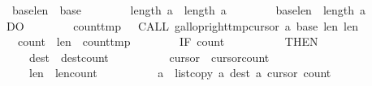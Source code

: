 \begin{isabellebody}
\ \ \ \ \ \ \ {\isacharparenleft}\isactrlbsup {\isasymsigma}\isactrlesup base{}{\isacharplus}\isactrlbsup {\isasymsigma}\isactrlesup len{}\ {\isacharequal}\ \isactrlbsup {\isasymsigma}\isactrlesup base{}{\isacharparenright}\ {\isasymand}\isanewline
\ \ \ \ \ \ \ length\ {\isasymacute}a\ {\isacharequal}\ length\ \isactrlbsup {\isasymsigma}\isactrlesup a\ {\isasymand}\isanewline
\ \ \ \ \ \ \ {\isacharparenleft}\isactrlbsup {\isasymsigma}\isactrlesup base{}{\isacharplus}\isactrlbsup {\isasymsigma}\isactrlesup len{}\ {\isasymle}\ length\ \isactrlbsup {\isasymsigma}\isactrlesup a{\isacharparenright}\ {\isasymrbrace}\isanewline
\ \ \ \ \ \ DO\isanewline
\ \ \ \ \ \ \ \ {\isasymacute}count{\isacharunderscore}tmp\ {\isacharcolon}{\isacharequal}{\isacharequal}\ \ CALL\ gallop{\isacharunderscore}right{\isacharparenleft}{\isasymacute}tmp{\isacharbang}{\isasymacute}cursor{}{\isacharcomma}\ {\isasymacute}a{\isacharcomma}\ {\isasymacute}base{}{\isacharcomma}\ {\isasymacute}len{}{\isacharcomma}\ {\isasymacute}len{}{\isacharminus}{}{\isacharparenright}{\isacharsemicolon}{\isacharsemicolon}\isanewline
\ \ \ \ \ \ \ \ {\isasymacute}count{}\ {\isacharcolon}{\isacharequal}{\isacharequal}\ {\isasymacute}len{}\ {\isacharminus}\ {\isasymacute}count{\isacharunderscore}tmp{\isacharsemicolon}{\isacharsemicolon}\isanewline
\ \ \ \ \ \ \ \ IF\ {\isasymacute}count{}\ {\isasymnoteq}\ {}\isanewline
\ \ \ \ \ \ \ \ THEN\isanewline
\ \ \ \ \ \ \ \ \ \ {\isasymacute}dest\ {\isacharcolon}{\isacharequal}{\isacharequal}\ {\isasymacute}dest{\isacharminus}{\isasymacute}count{}{\isacharsemicolon}{\isacharsemicolon}\isanewline
\ \ \ \ \ \ \ \ \ \ {\isasymacute}cursor{}\ {\isacharcolon}{\isacharequal}{\isacharequal}\ {\isasymacute}cursor{}{\isacharminus}{\isasymacute}count{}{\isacharsemicolon}{\isacharsemicolon}\isanewline
\ \ \ \ \ \ \ \ \ \ {\isasymacute}len{}\ {\isacharcolon}{\isacharequal}{\isacharequal}\ {\isasymacute}len{}{\isacharminus}{\isasymacute}count{}{\isacharsemicolon}{\isacharsemicolon}\isanewline
\ \ \ \ \ \ \ \ \ \ {\isasymacute}a\ {\isacharcolon}{\isacharequal}{\isacharequal}\ list{\isacharunderscore}copy\ {\isasymacute}a\ {\isacharparenleft}{\isasymacute}dest{\isacharplus}{}{\isacharparenright}\ {\isasymacute}a\ {\isacharparenleft}{\isasymacute}cursor{}{\isacharplus}{}{\isacharparenright}\ {\isasymacute}count{}{\isacharsemicolon}{\isacharsemicolon}\isanewline

\end{isabellebody}
